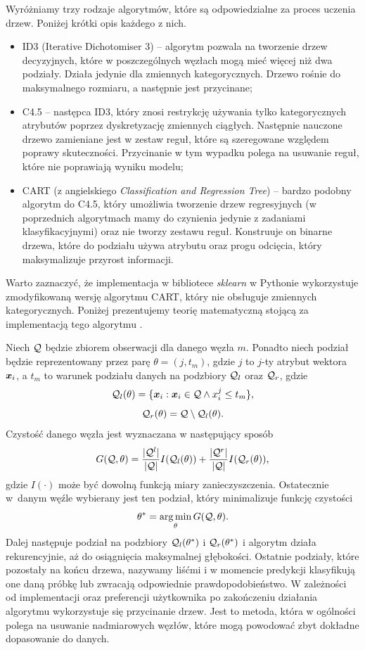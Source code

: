 \documentclass[inzynierska]{pwr_wmat_praca_dyplomowa}
\theoremstyle{plain}
\numberwithin{theorem}{chapter}
\theoremstyle{definition}
\numberwithin{theorem}{chapter}
\DeclareMathOperator*{\argmin}{arg\,min}
\begin{document}
Wyróżniamy trzy rodzaje algorytmów, które są odpowiedzialne za proces uczenia drzew. Poniżej krótki opis każdego z nich.
\begin{itemize}
	\item ID3 (Iterative Dichotomiser 3) -- algorytm pozwala na tworzenie drzew decyzyjnych, które w poszczególnych węzłach mogą mieć więcej niż dwa podziały. Działa jedynie dla zmiennych kategorycznych. Drzewo rośnie do maksymalnego rozmiaru, a następnie jest przycinane;
	\item C4.5 -- następca ID3, który znosi restrykcję używania tylko kategorycznych atrybutów poprzez dyskretyzację zmiennych ciągłych. Następnie nauczone drzewo zamieniane jest w zestaw reguł, które są szeregowane względem poprawy skuteczności. Przycinanie w tym wypadku polega na usuwanie reguł, które nie poprawiają wyniku modelu;
	\item CART (z angielskiego \textit{Classification and Regression Tree}) -- bardzo podobny algorytm do C4.5, który umożliwia tworzenie drzew regresyjnych (w poprzednich algorytmach mamy do czynienia jedynie z zadaniami klasyfikacyjnymi) oraz nie tworzy zestawu reguł. Konstruuje on binarne drzewa, które do podziału używa atrybutu oraz progu odcięcia, który maksymalizuje przyrost informacji.
\end{itemize}
Warto zaznaczyć, że implementacja w bibliotece \textit{sklearn} w Pythonie wykorzystuje zmodyfikowaną wersję algorytmu CART, który nie obsługuje zmiennych kategorycznych. Poniżej prezentujemy teorię matematyczną stojącą za implementacją tego algorytmu \cite{sklearn_api}.

Niech $\mathcal{Q}$ będzie zbiorem obserwacji dla danego węzła $m$. Ponadto niech podział będzie reprezentowany przez parę $\theta = (j, t_m)$, gdzie $j$ to $j$-ty atrybut wektora $\boldsymbol{x}_i$, a $t_m$ to warunek podziału danych na podzbiory $\mathcal{Q}_l$ oraz $\mathcal{Q}_r$, gdzie
$$ \mathcal{Q}_l (\theta) = \{ \boldsymbol{x}_i : \boldsymbol{x}_i \in \mathcal{Q} \land x^{j}_i \leq t_m \} \text{,} $$
$$ \mathcal{Q}_r (\theta) = \mathcal{Q} \setminus \mathcal{Q}_l(\theta) \text{.} $$
Czystość danego węzła jest wyznaczana w następujący sposób
$$ G(\mathcal{Q}, \theta) = \frac{|\mathcal{Q}^l|}{|\mathcal{Q}|} I(\mathcal{Q}_l (\theta)) + \frac{|\mathcal{Q}^r|}{|\mathcal{Q}|} I(\mathcal{Q}_r (\theta)) \text{,}$$
gdzie $I(\cdot)$ może być dowolną funkcją miary zanieczyszczenia. Ostatecznie w~danym węźle wybierany jest ten podział, który minimalizuje funkcję czystości
$$ \theta^* = \argmin_\theta G(\ku, \theta) \text{.}$$
Dalej następuje podział na podzbiory $\mathcal{Q}_l (\theta^*)$ i $\mathcal{Q}_r (\theta^*)$ i algorytm działa rekurencyjnie, aż do osiągnięcia maksymalnej głębokości. Ostatnie podziały, które pozostały na końcu drzewa, nazywamy liśćmi i w momencie predykcji klasyfikują one daną próbkę lub zwracają odpowiednie prawdopodobieństwo.
W zależności od implementacji oraz preferencji użytkownika po zakończeniu działania algorytmu wykorzystuje się przycinanie drzew. Jest to metoda, która w ogólności polega na usuwanie nadmiarowych węzłów, które mogą powodować zbyt dokładne dopasowanie do danych. 
\end{document}
